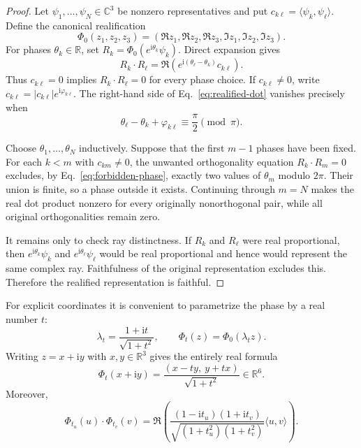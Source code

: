 \documentclass[twocolumn,aps,pra,floatfix,amsmath,amssymb,longbibliography]{revtex4-2}
\theoremstyle{definition}
\theoremstyle{remark}
\newcommand{\ii}{\mathrm{i}}
\newcommand{\C}{\mathbb C}
\newcommand{\R}{\mathbb R}
\begin{document}
\begin{proof}
Let $\psi_1,\ldots,\psi_N\in\C^3$ be nonzero representatives and put
$c_{k\ell}=\langle\psi_k,\psi_\ell\rangle$.  Define the canonical
realification
\begin{equation}
 \Phi_0(z_1,z_2,z_3)
 = (\Re z_1,\Re z_2,\Re z_3,\Im z_1,\Im z_2,\Im z_3).
 \label{eq:canonical-realification}
\end{equation}
For phases $\theta_k\in\R$, set
$R_k=\Phi_0(e^{\ii\theta_k}\psi_k)$.  Direct expansion gives
\begin{equation}
 R_k\mathbin{\cdot}R_\ell
 =\Re\!\left(e^{\ii(\theta_\ell-\theta_k)}c_{k\ell}\right).
 \label{eq:realified-dot}
\end{equation}
Thus $c_{k\ell}=0$ implies $R_k\cdot R_\ell=0$ for every phase choice.
If $c_{k\ell}\ne0$, write
$c_{k\ell}=|c_{k\ell}|e^{\ii\varphi_{k\ell}}$.  The right-hand side of
Eq.~\eqref{eq:realified-dot} vanishes precisely when
\begin{equation}
 \theta_\ell-\theta_k+\varphi_{k\ell}
 \equiv\frac{\pi}{2}\pmod\pi.
 \label{eq:forbidden-phase}
\end{equation}

Choose $\theta_1,\ldots,\theta_N$ inductively.  Suppose that the first $m-1$
phases have been fixed.  For each $k<m$ with $c_{km}\ne0$, the unwanted
orthogonality equation $R_k\mathbin{\cdot}R_m=0$ excludes, by
Eq.~\eqref{eq:forbidden-phase}, exactly two values of $\theta_m$ modulo
$2\pi$.  Their union is finite, so a phase outside it exists.  Continuing
through $m=N$ makes the real dot product nonzero for every originally
nonorthogonal pair, while all original orthogonalities remain zero.

It remains only to check ray distinctness.  If $R_k$ and $R_\ell$ were real
proportional, then $e^{\ii\theta_k}\psi_k$ and
$e^{\ii\theta_\ell}\psi_\ell$ would be real proportional and hence would
represent the same complex ray.  Faithfulness of the original representation
excludes this.  Therefore the realified representation is faithful.
\end{proof}

For explicit coordinates it is convenient to parametrize the phase by a real
number $t$:
\begin{equation}
 \lambda_t=\frac{1+\ii t}{\sqrt{1+t^2}},\qquad
 \Phi_t(z)=\Phi_0(\lambda_tz).
 \label{eq:lambda-t}
\end{equation}
Writing $z=x+\ii y$ with $x,y\in\R^3$ gives the entirely real formula
\begin{equation}
 \Phi_t(x+\ii y)=\frac{(x-ty,\ y+tx)}{\sqrt{1+t^2}}\in\R^6.
 \label{eq:explicit-realification}
\end{equation}
Moreover,
\begin{equation}
 \Phi_{t_u}(u)\mathbin{\cdot}\Phi_{t_v}(v)
 =\Re\!\left(
 \frac{(1-\ii t_u)(1+\ii t_v)}
 {\sqrt{(1+t_u^2)(1+t_v^2)}}\langle u,v\rangle
 \right).
 \label{eq:t-dot}
\end{equation}
\end{document}
